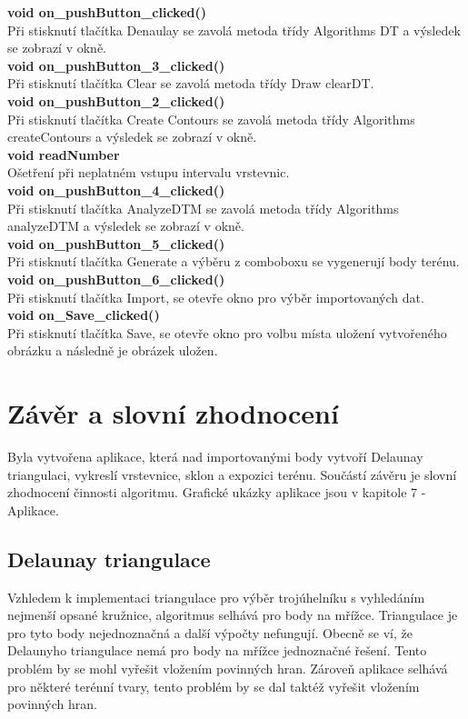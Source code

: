 \documentclass[a4paper, 12pt]{article}
\begin{document}
\textbf{void on\_pushButton\_clicked()}\\
Při stisknutí tlačítka Denaulay se zavolá metoda třídy Algorithms DT a výsledek se zobrazí v okně.
\\

\textbf{void on\_pushButton\_3\_clicked()}\\
Při stisknutí tlačítka Clear se zavolá metoda třídy Draw clearDT.
\\

\textbf{void on\_pushButton\_2\_clicked()}\\
Při stisknutí tlačítka Create Contours se zavolá metoda třídy Algorithms createContours a výsledek se zobrazí v okně.
\\

\textbf{void readNumber}\\
Ošetření při neplatném vstupu intervalu vrstevnic.
\\

\textbf{void on\_pushButton\_4\_clicked()}\\
Při stisknutí tlačítka AnalyzeDTM se zavolá metoda třídy Algorithms analyzeDTM a výsledek se zobrazí v okně.
\\

\textbf{void on\_pushButton\_5\_clicked()}\\
Při stisknutí tlačítka Generate a výběru z comboboxu se vygenerují body terénu.
\\

\textbf{void on\_pushButton\_6\_clicked()}\\
Při stisknutí tlačítka Import, se otevře okno pro výběr importovaných dat.
\\

\textbf{void on\_Save\_clicked()}\\
Při stisknutí tlačítka Save, se otevře okno pro volbu místa uložení vytvořeného obrázku a následně je obrázek uložen.
\\


\clearpage
\section{Závěr a slovní zhodnocení}
Byla vytvořena aplikace, která nad importovanými body vytvoří Delaunay triangulaci, vykreslí vrstevnice, sklon a expozici terénu. Součástí závěru je slovní zhodnocení činnosti algoritmu. Grafické ukázky aplikace jsou v kapitole 7 - Aplikace. \\

\subsection{Delaunay triangulace}
Vzhledem k implementaci triangulace pro výběr trojúhelníku s vyhledáním nejmenší opsané kružnice, algoritmus selhává pro body na mřížce. Triangulace je pro tyto body nejednoznačná a další výpočty nefungují. Obecně se ví, že Delaunyho triangulace nemá pro body na mřížce jednoznačné řešení. Tento problém by se mohl vyřešit vložením povinných hran. Zároveň aplikace selhává pro některé terénní tvary, tento problém by se dal taktéž vyřešit vložením povinných hran. \\
\end{document}
